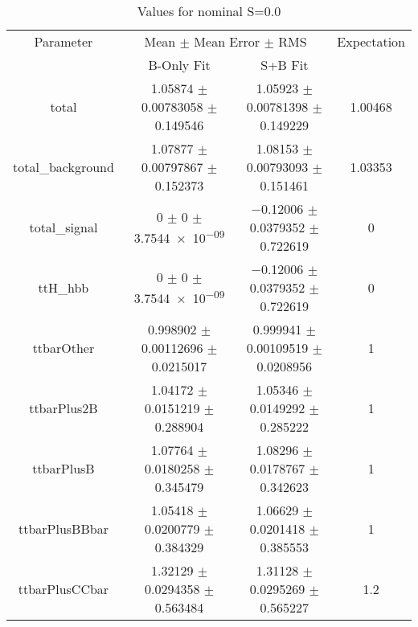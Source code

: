 \begin{table}
\centering
\caption{Values for nominal S=0.0}
\begin{tabular}{cccc}
\toprule
Parameter & \multicolumn{2}{c}{Mean $\pm$ Mean Error $\pm$ RMS} & Expectation\\
 & B-Only Fit & S+B Fit & \\
\midrule
total & \num{1.05874} $\pm$ \num{0.00783058} $\pm$ \num{0.149546} & \num{1.05923} $\pm$ \num{0.00781398} $\pm$ \num{0.149229} & \num{1.00468}\\
total\_background & \num{1.07877} $\pm$ \num{0.00797867} $\pm$ \num{0.152373} & \num{1.08153} $\pm$ \num{0.00793093} $\pm$ \num{0.151461} & \num{1.03353}\\
total\_signal & \num{0} $\pm$ \num{0} $\pm$ \num{3.7544e-09} & \num{-0.12006} $\pm$ \num{0.0379352} $\pm$ \num{0.722619} & \num{0}\\
ttH\_hbb & \num{0} $\pm$ \num{0} $\pm$ \num{3.7544e-09} & \num{-0.12006} $\pm$ \num{0.0379352} $\pm$ \num{0.722619} & \num{0}\\
ttbarOther & \num{0.998902} $\pm$ \num{0.00112696} $\pm$ \num{0.0215017} & \num{0.999941} $\pm$ \num{0.00109519} $\pm$ \num{0.0208956} & \num{1}\\
ttbarPlus2B & \num{1.04172} $\pm$ \num{0.0151219} $\pm$ \num{0.288904} & \num{1.05346} $\pm$ \num{0.0149292} $\pm$ \num{0.285222} & \num{1}\\
ttbarPlusB & \num{1.07764} $\pm$ \num{0.0180258} $\pm$ \num{0.345479} & \num{1.08296} $\pm$ \num{0.0178767} $\pm$ \num{0.342623} & \num{1}\\
ttbarPlusBBbar & \num{1.05418} $\pm$ \num{0.0200779} $\pm$ \num{0.384329} & \num{1.06629} $\pm$ \num{0.0201418} $\pm$ \num{0.385553} & \num{1}\\
ttbarPlusCCbar & \num{1.32129} $\pm$ \num{0.0294358} $\pm$ \num{0.563484} & \num{1.31128} $\pm$ \num{0.0295269} $\pm$ \num{0.565227} & \num{1.2}\\
\bottomrule
\end{tabular}
\end{table}